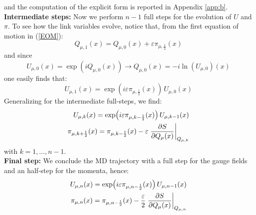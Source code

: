 and the computation of the explicit form is reported in Appendix \ref{app:b}.
\\ \textbf{Intermediate steps:} Now we perform $n-1$ full steps for the evolution of $U$ and $\pi$. To see how the link variables evolve, notice that, from the first equation of motion in (\ref{EOM}):
\begin{equation}\label{first step Q}
    Q_{\mu,1}(x) = Q_{\mu, 0}(x) + \varepsilon \pi_{\mu,\frac{1}{2}}(x)
\end{equation}
and since 
\begin{equation*}
    U_{\mu,0}(x) = \exp(iQ_{\mu,0}(x)) \to Q_{\mu, 0}(x) = -i \ln(U_{\mu, 0})(x)
\end{equation*}
one easily finds that:
\begin{equation*}
    U_{\mu, 1}(x) = \exp(i\varepsilon \pi_{\mu, \frac{1}{2}} (x))\, U_{\mu, 0}(x)
\end{equation*}
Generalizing for the intermediate full-steps, we find:
\begin{equation}
    \begin{split}
        U_{\mu, k}(x) = \exp(i\varepsilon \pi_{\mu, k - \frac{1}{2}} (x))\, U_{\mu, k-1}(x) \\
        \pi_{\mu, k + \frac{1}{2}}(x) = \pi_{\mu, k - \frac{1}{2}}(x) - \varepsilon \left. \pdv{S}{Q_\mu(x)} \right\rvert_{Q_{\mu, k}} \\
    \end{split}
\end{equation}
with $k = 1, \dots, n-1$.
\medskip
\\ \textbf{Final step:} We conclude the MD trajectory with a full step for the gauge fields and an half-step for the momenta, hence:
\begin{equation}
    \begin{split}
        U_{\mu, n}(x) = \exp(i\varepsilon \pi_{\mu, n - \frac{1}{2}} (x))\, U_{\mu, n-1}(x) \\
        \pi_{\mu, n}(x) = \pi_{\mu, n - \frac{1}{2}}(x) - \frac{\varepsilon}{2} \left. \pdv{S}{Q_\mu(x)} \right\rvert_{Q_{\mu, n}} \\
    \end{split}
\end{equation}

